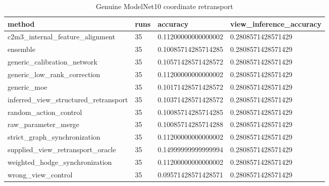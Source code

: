 \begin{table}[t]
\centering
\caption{Genuine ModelNet10 coordinate retransport}
\begin{tabular}{llll}
\toprule
method & runs & accuracy & view\_inference\_accuracy \\
\midrule
c2m3\_internal\_feature\_alignment & 35 & 0.11200000000000002 & 0.2808571428571429 \\
ensemble & 35 & 0.10085714285714285 & 0.2808571428571429 \\
generic\_calibration\_network & 35 & 0.10571428571428572 & 0.2808571428571429 \\
generic\_low\_rank\_correction & 35 & 0.11200000000000002 & 0.2808571428571429 \\
generic\_moe & 35 & 0.10171428571428572 & 0.2808571428571429 \\
inferred\_view\_structured\_retransport & 35 & 0.10371428571428572 & 0.2808571428571429 \\
random\_action\_control & 35 & 0.10085714285714285 & 0.2808571428571429 \\
raw\_parameter\_merge & 35 & 0.10085714285714288 & 0.2808571428571429 \\
strict\_graph\_synchronization & 35 & 0.11200000000000002 & 0.2808571428571429 \\
supplied\_view\_retransport\_oracle & 35 & 0.14999999999999994 & 0.2808571428571429 \\
weighted\_hodge\_synchronization & 35 & 0.11200000000000002 & 0.2808571428571429 \\
wrong\_view\_control & 35 & 0.09571428571428571 & 0.2808571428571429 \\
\bottomrule
\end{tabular}
\end{table}
